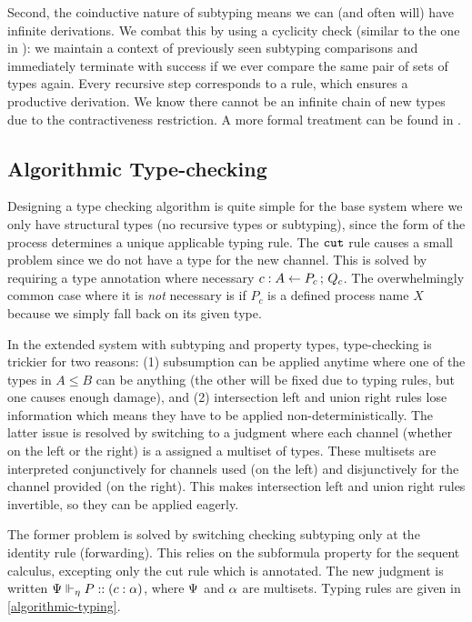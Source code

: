 \documentclass[submission,copyright,creativecommons]{eptcs}
\begin{document}
Second, the coinductive nature of subtyping means we can (and often will) have infinite derivations. We combat this by using a cyclicity check (similar to the one in \cite{GayH05}): we maintain a context of previously seen subtyping comparisons and immediately terminate with success if we ever compare the same pair of sets of types again. Every recursive step corresponds to a rule, which ensures a productive derivation. We know there cannot be an infinite chain of new types due to the contractiveness restriction. A more formal treatment can be found in \cite{Stone05un}.


\subsection{Algorithmic Type-checking}

Designing a type checking algorithm is quite simple for the base system where we only have structural types (no recursive types or subtyping), since the form of the process determines a unique applicable typing rule. The $\cut$ rule causes a small problem since we do not have a type for the new channel. This is solved by requiring a type annotation where necessary $\tspawnType c {P_c} A {Q_c}$.  The overwhelmingly common case where it is \emph{not} necessary is if $P_c$ is a defined process name $X$ because we simply fall back on its given type.

In the extended system with subtyping and property types, type-checking is trickier for two reasons: (1) subsumption can be applied anytime where one of the types in $A \le B$ can be anything (the other will be fixed due to typing rules, but one causes enough damage), and (2) intersection left and union right rules lose information which means they have to be applied non-deterministically. The latter issue is resolved by switching to a judgment where each channel (whether on the left or the right) is a assigned a multiset of types.  These multisets are interpreted conjunctively for channels used (on the left) and disjunctively for the channel provided (on the right). This makes intersection left and union right rules invertible, so they can be applied eagerly.

The former problem is solved by switching checking subtyping only at the identity rule (forwarding). This relies on the subformula property for the sequent calculus, excepting only the cut rule which is annotated. The new judgment is written $\typeRecAJ P c \typeList$, where $\ctx$ and $\typeList$ are multisets. Typing rules are given in \autoref{algorithmic-typing}.
\end{document}
